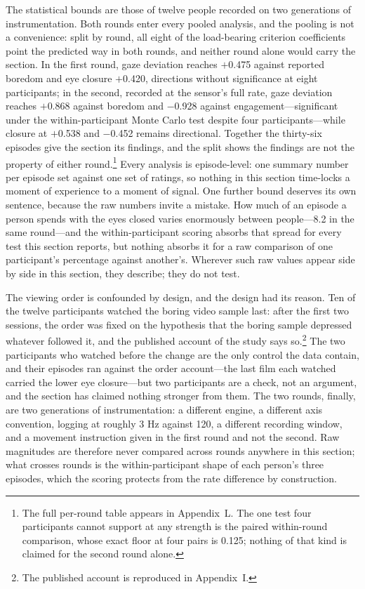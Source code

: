 The statistical bounds are those of twelve people recorded on two generations of
instrumentation. Both rounds enter every pooled analysis, and the pooling is not a
convenience: split by round, all eight of the load-bearing criterion coefficients point the
predicted way in both rounds, and neither round alone would carry the section. In the first
round, gaze deviation reaches $+$0.475 against reported boredom and eye closure $+$0.420,
directions without significance at eight participants; in the second, recorded at the
sensor's full rate, gaze deviation reaches $+$0.868 against boredom and $-$0.928 against
engagement---significant under the within-participant Monte Carlo test despite four
participants---while closure at $+$0.538 and $-$0.452 remains directional. Together the
thirty-six episodes give the section its findings, and the split shows the findings are not
the property of either round.\footnote{The full per-round table appears in Appendix~L. The
one test four participants cannot support at any strength is the paired within-round
comparison, whose exact floor at four pairs is 0.125; nothing of that kind is claimed for the
second round alone.} Every analysis is episode-level:
one summary number per episode set against one set of ratings, so nothing in this section
time-locks a moment of experience to a moment of signal. One further bound deserves its own
sentence, because the raw numbers invite a mistake. How much of an episode a person spends
with the eyes closed varies enormously between people---8.2%
in the same round---and the within-participant scoring absorbs that spread for every test
this section reports, but nothing absorbs it for a raw comparison of one participant's
percentage against another's. Wherever such raw values appear side by side in this section,
they describe; they do not test.

The viewing order is confounded by design, and the design had its reason. Ten of the twelve
participants watched the boring video sample last: after the first two sessions, the order
was fixed on the hypothesis that the boring sample depressed whatever followed it, and the
published account of the study says so.\footnote{The published account is reproduced in
Appendix~I.} The two participants who watched before the change are the only control
the data contain, and their episodes ran against the order account---the last film each
watched carried the lower eye closure---but two participants are a check, not an argument,
and the section has claimed nothing stronger from them. The two rounds, finally, are two
generations of instrumentation: a different engine, a different axis convention, logging at
roughly 3 Hz against 120, a different recording window, and a movement instruction given in
the first round and not the second. Raw magnitudes are therefore never compared across rounds
anywhere in this section; what crosses rounds is the within-participant shape of each
person's three episodes, which the scoring protects from the rate difference by construction.

